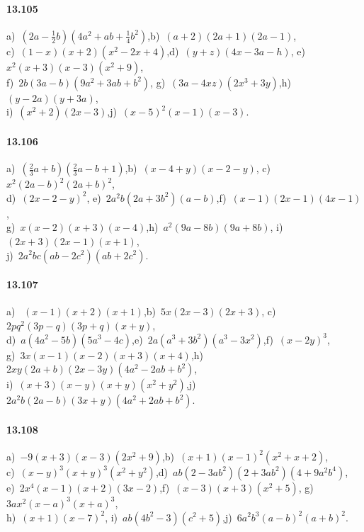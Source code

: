 \paragraph{13.105} a)~$\left(2a-\frac{1}{2}b\right)\left(4a^{2}+{ab}+\frac{1}{4}b^{2}\right)$,\quad b)~$(a+2)\left(2a+1\right)\left(2a-1\right)$,\quad \protect\\
c)~$(1-x)\left(x+2\right)\left(x^{2}-2x+4\right)$,\quad d)~$(y+z)(4x-3a-h)$,\quad
e)~$x^{2}(x+3)(x-3)\left(x^{2}+9\right)$,\protect\\
f)~$2b(3a-b)\left(9a^{2}+3{ab}+b^{2}\right)$,\quad
g)~$(3a-4{xz})\left(2x^{3}+3y\right)$,\quad h)~$(y-2a)\left(y+3a\right)$,\quad \protect\\
i)~$\left(x^{2}+2\right)(2x-3)$,\quad j)~$(x-5)^{2}(x-1)(x-3)$.

\paragraph{13.106} a)~$\left(\frac{2}{3}a+b\right)\left(\frac{2}{3}a-b+1\right)$,\quad b)~$(x-4+y)(x-2-y)$,\quad
c)~$x^{2}(2a-b)^{2}(2a+b)^{2}$,\protect\\
d)~$(2x-2-y)^{2}$,\quad
e)~$2a^{2}b(2a+3b^{2})(a-b)$,\quad f)~$(x-1)(2x-1)(4x-1)$,\quad \protect\\
g)~$x(x-2)(x+3)(x-4)$,\quad h)~$a^{2}(9a-8b)(9a+8b)$,\quad
i)~$(2x+3)(2x-1)(x+1)$,\protect\\
j)~$2a^{2}{bc}({ab}-2c^{2})({ab}+2c^{2})$.

\paragraph{13.107} a)~ $(x-1)(x+2)(x+1)$,\quad b)~$5x(2x-3)(2x+3)$,\quad
c)~$2{pq}^{2}(3p-q)(3p+q)(x+y)$,\protect\\
d)~$a(4a^{2}-5b)(5a^{3}-4c)$,\quad e)~$2a(a^{3}+3b^{2})(a^{3}-3x^{2})$,\quad f)~$(x-2y)^{3}$,\quad \protect\\
g)~$3x(x-1)(x-2)(x+3)(x+4)$,\quad h)~$2xy(2a+b)(2x-3y)(4a^{2}-2{ab}+b^{2})$,\quad \protect\\
i)~$(x+3)(x-y)(x+y)(x^{2}+y^{2})$,\quad j)~$2a^{2}b(2a-b)(3x+y)(4a^{2}+2{ab}+b^{2})$.

\paragraph{13.108} a)~$-9(x+3)(x-3)(2x^{2}+9)$,\quad b)~$(x+1)(x-1)^{2}(x^{2}+x+2)$,\quad \protect\\
c)~$(x-y)^{3}(x+y)^{3}(x^{2}+y^{2})$,\quad d)~${ab}(2-3{ab}^{2})(2+3{ab}^{2})(4+9a^{2}b^{4})$,\quad \protect\\
e)~$2x^{4}(x-1)(x+2)(3x-2)$,\quad f)~$(x-3)(x+3)(x^{2}+5)$,\quad
g)~$3ax^{2}(x-a)^{3}(x+a)^{3}$,\protect\\
h)~$(x+1)(x-7)^{2}$,\quad
i)~${ab}(4b^{2}-3)(c^{2}+5)$,\quad j)~$6a^{2}b^{3}(a-b)^{2}(a+b)^{2}$.

